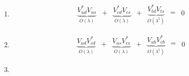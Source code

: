 \begin{enumerate}
 \item \begin{equation}
\begin{matrix} \underbrace{V_{ud}^*V_{us}}_{O(\lambda)} \end{matrix} \begin{matrix} {+}\\{ } \end{matrix} \begin{matrix} \underbrace{V_{cd}^*V_{cs}}_{O(\lambda)} \end{matrix} \begin{matrix} {+}\\{ } \end{matrix} \begin{matrix} \underbrace{V_{td}^*V_{ts}}_{O(\lambda^5)} \end{matrix} \begin{matrix} {=}\\{ } \end{matrix} \begin{matrix} {0}\\{ } \end{matrix}
 \end{equation}
 \item \begin{equation}
\begin{matrix} \underbrace{V_{ud}V_{cd}^*}_{O(\lambda)} \end{matrix} \begin{matrix} {+}\\{ } \end{matrix} \begin{matrix} \underbrace{V_{us}V_{cs}^*}_{O(\lambda)} \end{matrix} \begin{matrix} {+}\\{ } \end{matrix} \begin{matrix} \underbrace{V_{ub}V_{cb}^*}_{O(\lambda^5)} \end{matrix} \begin{matrix} {=}\\{ } \end{matrix} \begin{matrix} {0}\\{ } \end{matrix}
 \end{equation}
 \item \begin{equation}

\end{equation}
\end{enumerate}
